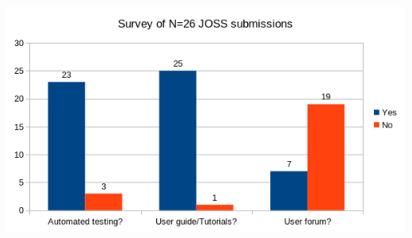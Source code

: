 \documentclass[a0paper,fleqn]{betterposter}
\begin{document}
{\vspace{3cm}
\includegraphics[width=\textwidth]{img/joss-survey.png}
}
\end{document}
